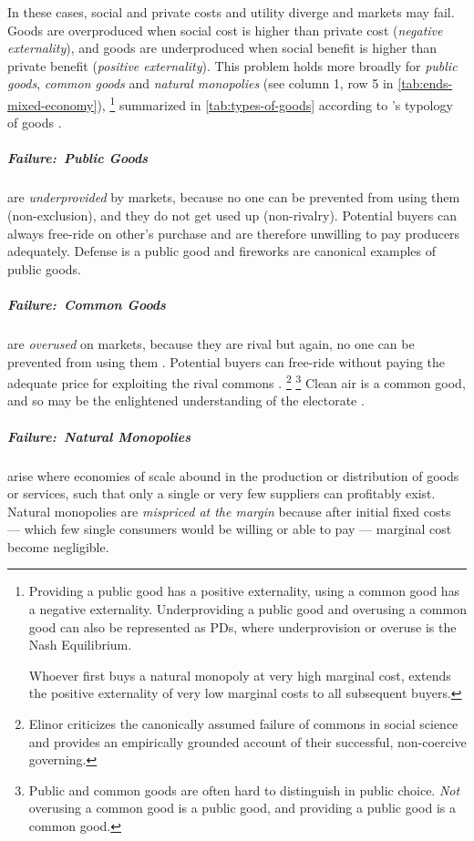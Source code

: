 In these cases, social and private costs and utility diverge and markets may fail.
Goods are overproduced when social cost is higher than private cost (\emph{negative externality}), and goods are underproduced when social benefit is higher than private benefit (\emph{positive externality}).
This problem holds more broadly for \emph{public goods}, \emph{common goods} and \emph{natural monopolies} (see column 1, row 5 in \autoref{tab:ends-mixed-economy}),
\footnote{
	Providing a public good has a positive externality, using a common good has a negative externality.
	Underproviding a public good and overusing a common good can also be represented as \glspl{PD}, where underprovision or overuse is the Nash Equilibrium.

	Whoever first buys a natural monopoly at very high marginal cost, extends the positive externality of very low marginal costs to all subsequent buyers.
}
summarized in \autoref{tab:types-of-goods} according to \citeauthor{Samuelson-1954-eu}'s typology of goods \citeyearpar{Samuelson-1954-eu}.



\subparagraph{Failure:\ Public Goods}  \label{sec:public-good} are \emph{underprovided} by markets, because no one can be prevented from using them (non-exclusion), and they do not get used up (non-rivalry).
Potential buyers can always free-ride on other's purchase and are therefore unwilling to pay producers adequately.
Defense is a public good and fireworks are canonical examples of public goods.

\subparagraph{Failure:\ Common Goods}  \label{sec:common-good} are \emph{overused} on markets, because they are rival but again, no one can be prevented from using them \citep{Hardin-1968-aa}.
Potential buyers can free-ride without paying the adequate price for exploiting the rival commons \citep{Hardin-1968-aa}.
\footnote{
	Elinor \cite{Ostrom1990} criticizes the canonically assumed failure of commons in social science and provides an empirically grounded account of their successful, non-coercive governing.
}
\footnote{
	Public and common goods are often hard to distinguish in public choice.
	\emph{Not} overusing a common good is a public good, and providing a public good is a common good.
}
Clean air is a common good, and so may be the enlightened understanding of the electorate \citep{Caplan2007}.

\subparagraph{Failure:\ Natural Monopolies}  \label{sec:natural-monopoly}
arise where economies of scale abound in the production or distribution of goods or services, such that only a single or very few suppliers can profitably exist.
Natural monopolies are \emph{mispriced at the margin} because after initial fixed costs --- which few single consumers would be willing or able to pay --- marginal cost become negligible.

